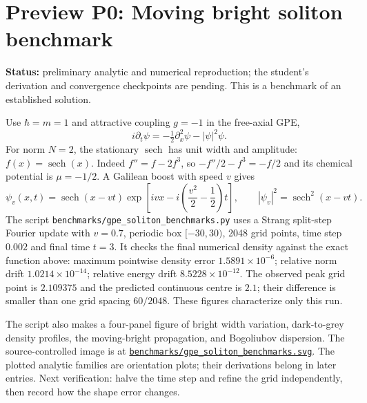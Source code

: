\section{Preview P0: Moving bright soliton benchmark}
\label{sec:P00}
\noindent\textbf{Status:} preliminary analytic and numerical reproduction; the student's derivation and convergence checkpoints are pending. This is a benchmark of an established solution.

Use $\hbar=m=1$ and attractive coupling $g=-1$ in the free-axial GPE,
\[
i\partial_t\psi=-\tfrac12\partial_x^2\psi-|\psi|^2\psi.
\]
For norm $N=2$, the stationary $\operatorname{sech}$ has unit width and amplitude: $f(x)=\operatorname{sech}(x)$. Indeed $f''=f-2f^3$, so $-f''/2-f^3=-f/2$ and its chemical potential is $\mu=-1/2$. A Galilean boost with speed $v$ gives
\[
\psi_v(x,t)=\operatorname{sech}(x-vt)
\exp\!\left[i v x-i\left(\frac{v^2}{2}-\frac12\right)t\right],
\qquad |\psi_v|^2=\operatorname{sech}^2(x-vt).
\]
The script \texttt{benchmarks/gpe\_soliton\_benchmarks.py} uses a Strang split-step Fourier update with $v=0.7$, periodic box $[-30,30)$, 2048 grid points, time step $0.002$ and final time $t=3$. It checks the final numerical density against the exact function above: maximum pointwise density error $1.5891\times10^{-6}$; relative norm drift $1.0214\times10^{-14}$; relative energy drift $8.5228\times10^{-12}$. The observed peak grid point is $2.109375$ and the predicted continuous centre is $2.1$; their difference is smaller than one grid spacing $60/2048$. These figures characterize only this run.

The script also makes a four-panel figure of bright width variation, dark-to-grey density profiles, the moving-bright propagation, and Bogoliubov dispersion. The source-controlled image is at \href{https://github.com/Kshitijsqdn303/Pure-Quantum-Mechanics/blob/main/BEC-Solitons-Research-Notebook/benchmarks/gpe_soliton_benchmarks.svg}{\texttt{benchmarks/gpe\_soliton\_benchmarks.svg}}. The plotted analytic families are orientation plots; their derivations belong in later entries. Next verification: halve the time step and refine the grid independently, then record how the shape error changes.
